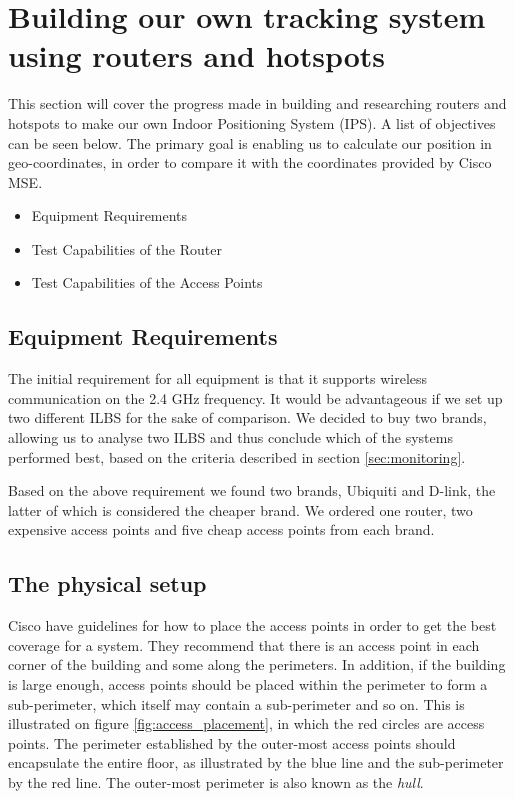 \section{Building our own tracking system using routers and hotspots}
This section will cover the progress made in building and researching routers and hotspots to make our own Indoor Positioning System (IPS). A list of objectives can be seen below. The primary goal is enabling us to calculate our position in geo-coordinates, in order to compare it with the coordinates provided by Cisco MSE.

\begin{itemize}
	\item Equipment Requirements
	\item Test Capabilities of the Router
	\item Test Capabilities of the Access Points
\end{itemize}

\subsection*{Equipment Requirements}
The initial requirement for all equipment is that it supports wireless communication on the 2.4 GHz frequency. It would be advantageous if we set up two different ILBS for the sake of comparison. We decided to buy two brands, allowing us to analyse two ILBS and thus conclude which of the systems performed best, based on the criteria described in section \ref{sec:monitoring}.

Based on the above requirement we found two brands, Ubiquiti and D-link, the latter of which is considered the cheaper brand. We ordered one router, two expensive access points and five cheap access points from each brand.

\subsection*{The physical setup}
Cisco\cite{access_point_placement} have guidelines for how to place the access points in order to get the best coverage for a system. They recommend that there is an access point in each corner of the building and some along the perimeters. In addition, if the building is large enough, access points should be placed within the perimeter to form a sub-perimeter, which itself may contain a sub-perimeter and so on. This is illustrated on figure \cref{fig:access_placement}, in which the red circles are access points. The perimeter established by the outer-most access points should encapsulate the entire floor, as illustrated by the blue line and the sub-perimeter by the red line. The outer-most perimeter is also known as the \textit{hull}\cite{access_point_placement}.

